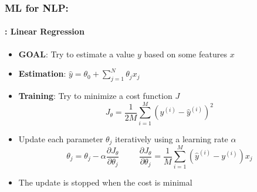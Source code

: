 \documentclass[xcolor=table]{beamer}
\begin{document}
	\begin{frame}
		\frametitle{ML for NLP: \insertsection}
		\framesubtitle{\insertsubsection: Linear Regression}
		
		\begin{minipage}{0.62\textwidth} 
			\begin{itemize}
				\item \textbf{GOAL}: Try to estimate a value $ y $ based on some features $ x $
				\item \textbf{Estimation}: $ \hat{y} = \theta_0 + \sum_{j=1}^{N} \theta_j x_j $
				\item \textbf{Training}: Try to minimize a cost function $ J $
				\[J_\theta = \frac{1}{2M} \sum\limits_{i=1}^{M} (y^{(i)} - \hat{y}^{(i)})^2\]
			\end{itemize}
		\end{minipage}
		\begin{minipage}{0.37\textwidth} 
		\end{minipage}
		
		\begin{itemize}
			
			\item Update each parameter $ \theta_j $ iteratively using a learning rate $ \alpha $
			\[\theta_j = \theta_j - \alpha \frac{\partial J_\theta}{\partial \theta_j}
			\hspace{1cm}
			\frac{\partial J_\theta}{\partial \theta_j} = \frac{1}{M} \sum\limits_{i=1}^{M} (\hat{y}^{(i)} - y^{(i)}) x_j
			\]
			\item The update is stopped when the cost is minimal
		\end{itemize}
	
	\end{frame}
\end{document}
